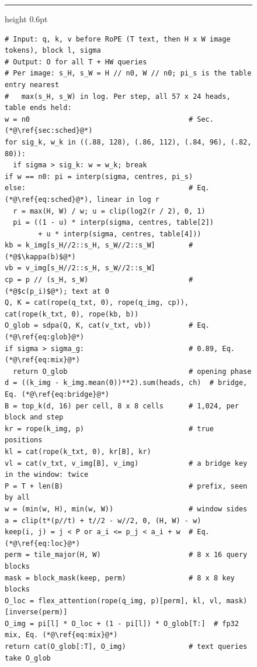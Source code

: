 \begin{figure}[p]
\vspace{8pt}
\noindent\begin{minipage}{\linewidth}
    \hrule height 0.6pt\vspace{2pt}
    \label{alg:sample_full}
    \vspace{-4pt}
\begin{lstlisting}[style=scacode, basicstyle=\fontfamily{lmtt}\fontsize{8}{9}\selectfont, emph={rope,sdpa,cat,clip,log2,interp,top_k,tile_major,block_mask,flex_attention,inverse}]
# Input: q, k, v before RoPE (T text, then H x W image tokens), block l, sigma
# Output: O for all T + HW queries
# Per image: s_H, s_W = H // n0, W // n0; pi_s is the table entry nearest
#   max(s_H, s_W) in log. Per step, all 57 x 24 heads, table ends held:
w = n0                                      # Sec. (*@\ref{sec:sched}@*)
for sig_k, w_k in ((.88, 128), (.86, 112), (.84, 96), (.82, 80)):
  if sigma > sig_k: w = w_k; break
if w == n0: pi = interp(sigma, centres, pi_s)
else:                                       # Eq. (*@\ref{eq:sched}@*), linear in log r
  r = max(H, W) / w; u = clip(log2(r / 2), 0, 1)
  pi = ((1 - u) * interp(sigma, centres, table[2])
        + u * interp(sigma, centres, table[4]))
kb = k_img[s_H//2::s_H, s_W//2::s_W]        # (*@$\kappa(b)$@*)
vb = v_img[s_H//2::s_H, s_W//2::s_W]
cp = p // (s_H, s_W)                        # (*@$c(p_i)$@*); text at 0
Q, K = cat(rope(q_txt, 0), rope(q_img, cp)), cat(rope(k_txt, 0), rope(kb, b))
O_glob = sdpa(Q, K, cat(v_txt, vb))         # Eq. (*@\ref{eq:glob}@*)
if sigma > sigma_g:                         # 0.89, Eq. (*@\ref{eq:mix}@*)
  return O_glob                             # opening phase
d = ((k_img - k_img.mean(0))**2).sum(heads, ch)  # bridge, Eq. (*@\ref{eq:bridge}@*)
B = top_k(d, 16) per cell, 8 x 8 cells      # 1,024, per block and step
kr = rope(k_img, p)                         # true positions
kl = cat(rope(k_txt, 0), kr[B], kr)
vl = cat(v_txt, v_img[B], v_img)            # a bridge key in the window: twice
P = T + len(B)                              # prefix, seen by all
w = (min(w, H), min(w, W))                  # window sides
a = clip(t*(p//t) + t//2 - w//2, 0, (H, W) - w)
keep(i, j) = j < P or a_i <= p_j < a_i + w  # Eq. (*@\ref{eq:loc}@*)
perm = tile_major(H, W)                     # 8 x 16 query blocks
mask = block_mask(keep, perm)               # 8 x 8 key blocks
O_loc = flex_attention(rope(q_img, p)[perm], kl, vl, mask)[inverse(perm)]
O_img = pi[l] * O_loc + (1 - pi[l]) * O_glob[T:]  # fp32 mix, Eq. (*@\ref{eq:mix}@*)
return cat(O_glob[:T], O_img)               # text queries take O_glob
\end{lstlisting}
\end{minipage}
\end{figure}

